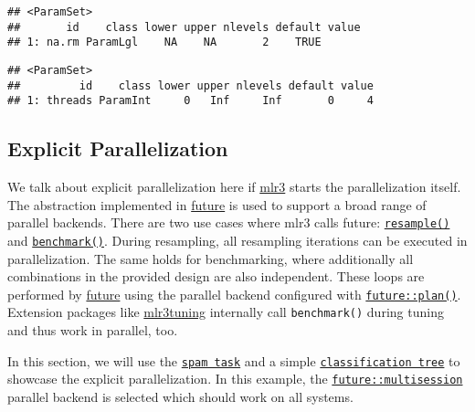 \documentclass[
]{scrbook}
\newenvironment{Shaded}{\begin{snugshade}}{\end{snugshade}}
\newcommand{\CommentTok}[1]{\textcolor[rgb]{0.56,0.35,0.01}{\textit{#1}}}
\newcommand{\DecValTok}[1]{\textcolor[rgb]{0.00,0.00,0.81}{#1}}
\newcommand{\NormalTok}[1]{#1}
\newcommand{\SpecialCharTok}[1]{\textcolor[rgb]{0.00,0.00,0.00}{#1}}
\renewenvironment{Shaded} {\begin{snugshade}\small} {\end{snugshade}}
\begin{document}
\begin{verbatim}
## <ParamSet>
##       id    class lower upper nlevels default value
## 1: na.rm ParamLgl    NA    NA       2    TRUE
\end{verbatim}

\begin{Shaded}
\end{Shaded}

\begin{verbatim}
## <ParamSet>
##         id    class lower upper nlevels default value
## 1: threads ParamInt     0   Inf     Inf       0     4
\end{verbatim}

\hypertarget{explicit-parallelization}{%
\subsection{Explicit Parallelization}\label{explicit-parallelization}}

We talk about explicit parallelization here if \href{https://mlr3.mlr-org.com}{mlr3} starts the parallelization itself.
The abstraction implemented in \href{https://cran.r-project.org/package=future}{future} is used to support a broad range of parallel backends.
There are two use cases where mlr3 calls future: \href{https://mlr3.mlr-org.com/reference/resample.html}{\texttt{resample()}} and \href{https://mlr3.mlr-org.com/reference/benchmark.html}{\texttt{benchmark()}}.
During resampling, all resampling iterations can be executed in parallelization.
The same holds for benchmarking, where additionally all combinations in the provided design are also independent.
These loops are performed by \href{https://cran.r-project.org/package=future}{future} using the parallel backend configured with \href{https://www.rdocumentation.org/packages/future/topics/plan}{\texttt{future::plan()}}.
Extension packages like \href{https://mlr3tuning.mlr-org.com}{mlr3tuning} internally call \texttt{benchmark()} during tuning and thus work in parallel, too.

In this section, we will use the \href{https://mlr3.mlr-org.com/reference/mlr_tasks_spam.html}{\texttt{spam\ task}} and a simple \href{https://mlr3.mlr-org.com/reference/mlr_learners_classif.rpart.html}{\texttt{classification\ tree}} to showcase the explicit parallelization.
In this example, the \href{https://www.rdocumentation.org/packages/future/topics/multisession}{\texttt{future::multisession}} parallel backend is selected which should work on all systems.
\end{document}
